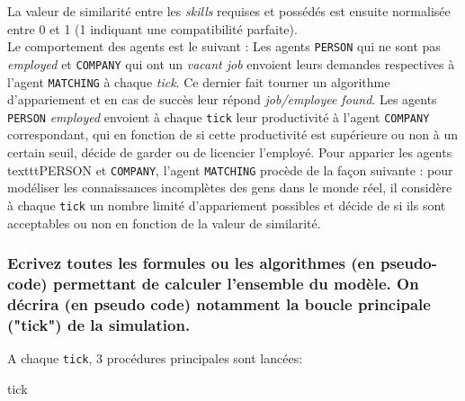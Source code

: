 \documentclass[10pt,a4paper]{article}
\begin{document}
    La valeur de similarité entre les \emph{skills} requises et possédés est ensuite normalisée entre 0 et 1 (1 indiquant une compatibilité parfaite). \\
    
    Le comportement des agents est le suivant :
    Les agents \texttt{PERSON} qui ne sont pas \emph{employed} et \texttt{COMPANY} qui ont un \emph{vacant job} envoient leurs demandes respectives à l'agent \texttt{MATCHING} à chaque \emph{tick}. Ce dernier fait tourner un algorithme d'appariement et en cas de succès leur répond \emph{job/employee found}. Les agents \texttt{PERSON} \emph{employed} envoient à chaque \texttt{tick} leur productivité à l'agent \texttt{COMPANY} correspondant, qui en fonction de si cette productivité est supérieure ou non à un certain seuil, décide de garder ou de licencier l'employé.
    Pour apparier les agents texttt{PERSON} et \texttt{COMPANY}, l'agent \texttt{MATCHING} procède de la façon suivante : pour modéliser les connaissances incomplètes des gens dans le monde réel, il considère à chaque \texttt{tick} un nombre limité d'appariement possibles et décide de si ils sont acceptables ou non en fonction de la valeur de similarité.
    
    \subsubsection{Ecrivez toutes les formules ou les algorithmes (en pseudo-code) permettant de calculer l'ensemble du modèle. On décrira (en pseudo code) notamment la boucle principale ("tick") de la simulation.}

    A chaque \texttt{tick}, 3 procédures principales sont lancées: \\
    
    \begin{algorithm}[H]
    \caption{tick}
    \SetAlgoLined
    \end{algorithm}
    
    \vspace{0.5cm}
    
\end{document}
